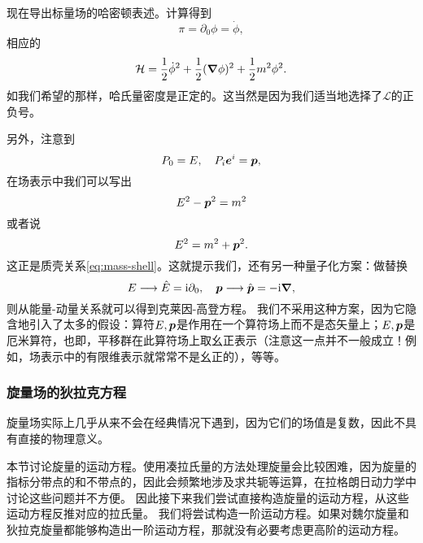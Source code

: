 \documentclass[hyperref, UTF8, a4paper]{ctexart}
\newcommand*{\ii}{\mathrm{i}}
\begin{document}
现在导出标量场的哈密顿表述。计算得到
\begin{equation}
    \pi = \partial_0 \phi = \dot{\phi},
    \label{eq:klein-gordon-pi}
\end{equation}
相应的
\begin{equation}
    \mathcal{H} = \frac{1}{2} \dot{\phi}^2 + \frac{1}{2} (\grad{\phi})^2 + \frac{1}{2} m^2 \phi^2.
\end{equation}
如我们希望的那样，哈氏量密度是正定的。这当然是因为我们适当地选择了$\mathcal{L}$的正负号。

另外，注意到 %
\[
    P_0 = E, \quad P_i \vb*{e}^i = \vb*{p},
\]
在场表示中我们可以写出
\[
    E^2 - \vb*{p}^2 = m^2
\]
或者说
\[
    E^2 = m^2 + \vb*{p}^2.
\]
这正是质壳关系\eqref{eq:mass-shell}。这就提示我们，还有另一种量子化方案：做替换
\[
    E \longrightarrow \hat{E} = \ii \partial_0, \quad \vb*{p} \longrightarrow \hat{\vb*{p}} = - \ii \grad,
\]
则从能量-动量关系就可以得到克莱因-高登方程。
我们不采用这种方案，因为它隐含地引入了太多的假设：算符$E, \vb*{p}$是作用在一个算符场上而不是态矢量上；$E,\vb*{p}$是厄米算符，也即，平移群在此算符场上取幺正表示（注意这一点并不一般成立！例如，场表示中的有限维表示就常常不是幺正的），等等。

\subsubsection{旋量场的狄拉克方程}

旋量场实际上几乎从来不会在经典情况下遇到，因为它们的场值是复数，因此不具有直接的物理意义。

本节讨论旋量的运动方程。使用凑拉氏量的方法处理旋量会比较困难，因为旋量的指标分带点的和不带点的，因此会频繁地涉及求共轭等运算，在拉格朗日动力学中讨论这些问题并不方便。
因此接下来我们尝试直接构造旋量的运动方程，从这些运动方程反推对应的拉氏量。
我们将尝试构造一阶运动方程。如果对魏尔旋量和狄拉克旋量都能够构造出一阶运动方程，那就没有必要考虑更高阶的运动方程。
\end{document}
